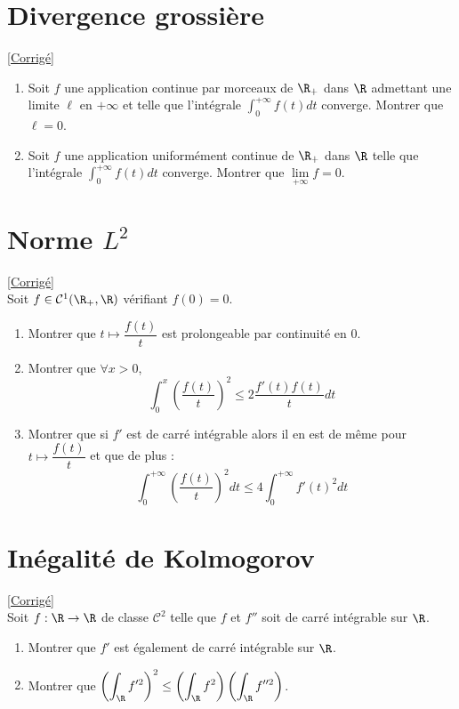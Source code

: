 \documentclass{book}
\begin{document}
	\section{Divergence grossière}
	\textcolor{blue}{\hyperref[Divergence grossière corrigé]{[Corrigé]}}\\
	\label{Divergence grossière}
	\begin{enumerate}[leftmargin=*]
		\item Soit $f$ une application continue par morceaux de $\R_+$ dans $\R$ admettant une limite $\ell$ en $+\infty$ et telle que l'intégrale $\displaystyle\int_0^{+\infty}f(t)dt$ converge. Montrer que $\ell=0$.
		\item Soit $f$ une application uniformément continue de $\R_+$ dans $\R$ telle que l'intégrale $\displaystyle\int_0^{+\infty}f(t)dt$ converge. Montrer que $\lim\limits_{+\infty}f=0$.
	\end{enumerate}
	
	\section{Norme $L^2$}
	\textcolor{blue}{\hyperref[Norme L^2 corrigé]{[Corrigé]}}\\
	\label{Norme L^2}
	Soit $f\in \mathcal C^1(\R_+,\R)$ vérifiant $f(0)=0$.
	\begin{enumerate}
		\item Montrer que $t\mapsto \dfrac{f(t)}{t}$ est prolongeable par continuité en $0$.
		\item Montrer que $\forall x>0$,
		$$\int_0^x\left(\frac{f(t)}{t}\right)^2\leq 2\frac{f'(t)f(t)}{t}dt$$
		\item Montrer que si $f'$ est de carré intégrable alors il en est de même pour $t\mapsto \dfrac{f(t)}{t}$ et que de plus :
		$$\int_0^{+\infty}\left(\frac{f(t)}{t}\right)^2dt\leq 4\int_0^{+\infty}f'(t)^2dt$$
	\end{enumerate}
	
	\section{Inégalité de Kolmogorov}
	\textcolor{blue}{\hyperref[Inégalité de Kolmogorov corrigé]{[Corrigé]}}\\
	\label{Inégalité de Kolmogorov}
	Soit $f:\R\to \R$ de classe $\mathcal C^2$ telle que $f$ et $f''$ soit de carré intégrable sur $\R$.
	\begin{enumerate}
		\item Montrer que $f'$ est également de carré intégrable sur $\R$.
		\item Montrer que $\displaystyle\left(\int_\R f'^2\right)^2\leq \left(\int_\R f^2\right)\left(\int_\R f''^2\right)$.
	\end{enumerate}
	
\end{document}
